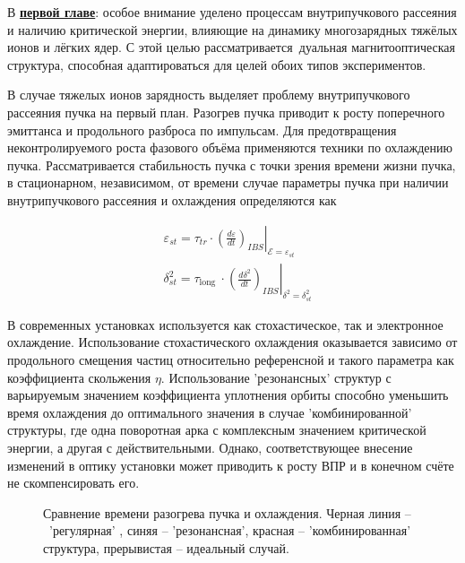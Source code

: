 В \underline{\textbf{первой главе}}: особое внимание уделено процессам внутрипучкового рассеяния и наличию критической энергии, влияющие на динамику многозарядных тяжёлых ионов и лёгких ядер. С этой целью рассматривается дуальная магнитооптическая структура, способная адаптироваться для целей обоих типов экспериментов.
\par В случае тяжелых ионов зарядность выделяет проблему внутрипучкового рассеяния пучка на первый план. Разогрев пучка приводит к росту поперечного эмиттанса и продольного разброса по импульсам. Для предотвращения неконтролируемого роста фазового объёма применяются техники по охлаждению пучка. Рассматривается стабильность пучка с точки зрения времени жизни пучка, в стационарном, независимом, от времени случае параметры пучка при наличии внутрипучкового рассеяния и охлаждения определяются как

\[
    \begin{aligned}
& \varepsilon_{s t}=\left.\tau_{t r} \cdot\left(\frac{d \varepsilon}{d t}\right)_{I B S}\right|_{\mathcal{E}=\varepsilon_{s t}} \\
& \delta_{s t}^2=\left.\tau_{\text {long }} \cdot\left(\frac{d \delta^2}{d t}\right)_{I B S}\right|_{\delta^2=\delta_{s t}^2}
\end{aligned}
\]

\noindent В современных установках используется как стохастическое, так и электронное охлаждение. Использование стохастического охлаждения оказывается зависимо от продольного смещения частиц относительно референсной и такого параметра как коэффициента скольжения $\eta$. Использование 'резонансных' структур с варьируемым значением коэффициента уплотнения орбиты способно уменьшить время охлаждения до оптимального значения в случае 'комбинированной' структуры, где одна поворотная арка с комплексным значением критической энергии, а другая с действительными. Однако, соответствующее внесение изменений в оптику установки может приводить к росту ВПР и в конечном счёте не скомпенсировать его.

\begin{figure}[ht]
    \caption{Сравнение времени разогрева пучка и охлаждения. Черная линия – 'регулярная' , синяя – 'резонансная', красная – 'комбинированная' структура, прерывистая – идеальный случай.}\label{fig:latex}
\end{figure}

